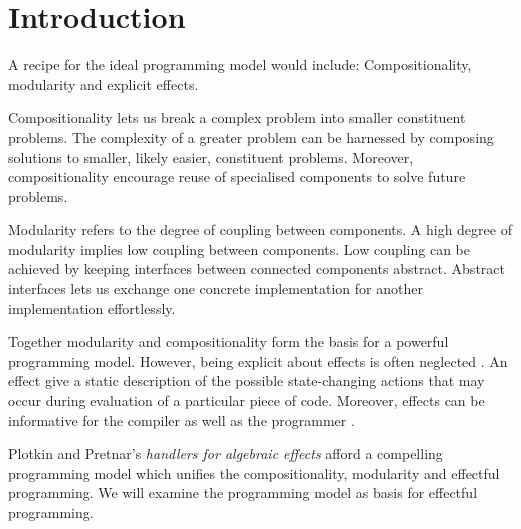 \chapter{Introduction}
A recipe for the ideal programming model would include: Compositionality, modularity and explicit effects.

Compositionality lets us break a complex problem into smaller constituent problems. The complexity of a greater problem can be harnessed by composing solutions to smaller, likely easier, constituent problems. Moreover, compositionality encourage reuse of specialised components to solve future problems.

Modularity refers to the degree of coupling between components. A high degree of modularity implies low coupling between components. Low coupling can be achieved by keeping interfaces between connected components abstract. Abstract interfaces lets us exchange one concrete implementation for another implementation effortlessly.

Together modularity and compositionality form the basis for a powerful programming model. However, being explicit about effects is often neglected \cite{Meijer2014}. An effect give a static description of the possible state-changing actions that may occur during evaluation of a particular piece of code. Moreover, effects can be informative for the compiler as well as the programmer \cite{Kammar2012,Meijer2014}.

Plotkin and Pretnar's \emph{handlers for algebraic effects} \cite{Plotkin2013} afford a compelling programming model which unifies the compositionality, modularity and effectful programming. We will examine the programming model as basis for effectful programming.